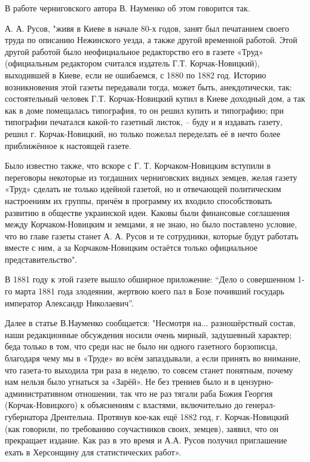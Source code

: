 
В работе черниговского автора В. Науменко об этом говорится так. 

А. А. Русов, "живя в Киеве в начале 80-х годов, занят был печатанием своего
труда по описанию Нежинского уезда, а также другой временной работой. Этой
другой работой было неофициальное редакторство его в газете «Труд» (официальным
редактором считался издатель Г.Т. Корчак-Новицкий), выходившей в Киеве, если не
ошибаемся, с 1880 по 1882 год. Историю возникновения этой газеты передавали
тогда, может быть, анекдотически, так: состоятельный человек Г.Т.
Корчак-Новицкий купил в Киеве доходный дом, а так как в доме помещалась
типография, то он решил купить и типографию; при типографии печатался какой-то
газетный листок, – буду и я издавать газету, решил г. Корчак-Новицкий, но
только пожелал переделать её в нечто более приближённое к настоящей газете.


Было известно также, что вскоре с Г. Т. Корчаком-Новицким вступили в переговоры
некоторые из тогдашних черниговских видных земцев, желая газету «Труд» сделать
не только идейной газетой, но и отвечающей политическим настроениям их группы,
причём в программу их входило способствовать развитию в обществе украинской
идеи. Каковы были финансовые соглашения между Корчаком-Новицким и земцами, я не
знаю, но было поставлено условие, что во главе газеты станет А. А. Русов и те
сотрудники, которые будут работать вместе с ним, а за Корчаком-Новицким
остаётся только официальное представительство". 


В 1881 году к этой газете вышло обширное приложение: \enquote{Дело о совершенном 1-го
марта 1881 года злодеянии, жертвою коего пал в Бозе почивший государь
император Александр Николаевич}.


Далее в статье В.Науменко сообщается: "Несмотря на... разношёрстный состав, наши
редакционные обсуждения носили очень мирный, задушевный характер; беда только в
том, что среди нас не было ни одного газетного борзописца, благодаря чему мы в
«Труде» во всём запаздывали, а если принять во внимание, что газета-то выходила
три раза в неделю, то совсем станет понятным, почему нам нельзя было угнаться
за «Зарёй». Не без трениев было и в цензурно-административном отношении, так
что не раз тягали раба Божия Георгия (Корчак-Новицкого) к объяснениям с
властями, включительно до генерал-губернатора Дрентельна. Протянув кое-как ещё
1882 год, г. Корчак-Новицкий (как говорили, по требованию соучастников своих,
земцев), заявил, что он прекращает издание. Как раз в это время и А.А. Русов
получил приглашение ехать в Херсонщину для статистических работ».

